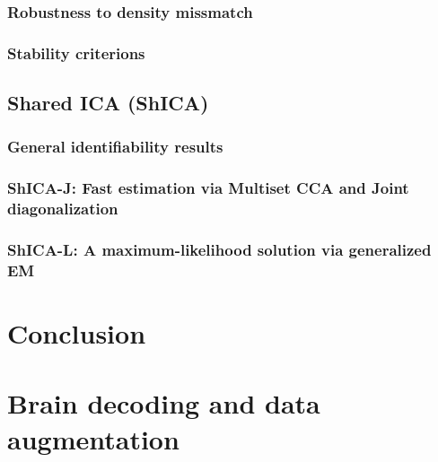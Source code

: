 \documentclass[12pt]{report}
\begin{document}
\subsection{Robustness to density missmatch}
\subsection{Stability criterions}
\section{Shared ICA (ShICA)}
\subsection{General identifiability results}
\subsection{ShICA-J: Fast estimation via Multiset CCA and Joint diagonalization}
\subsection{ShICA-L: A maximum-likelihood solution via generalized EM}

\chapter{Conclusion}

\appendix
\chapter{Brain decoding and data augmentation}
\end{document}
